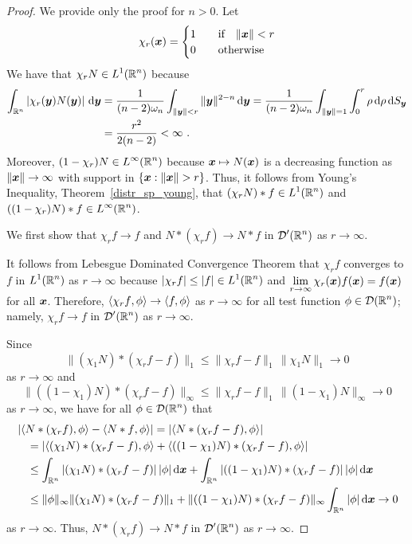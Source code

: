 \begin{proof}
We provide only the proof for $n>0$.  Let
\[
\chi_r({\bm{x}}) = \begin{cases}
1 & \quad \text{if} \quad \|{\bm{x}}\| < r \\
0 & \quad \text{otherwise}
\end{cases}
\]
We have that $\displaystyle \chi_r N \in L^1(\mathbb{R}^n)$ because
\begin{align*}
\int_{\mathbb{R}^n} \left| \chi_r({\bm{y}}) N({\bm{y}}) \right| \,\mathrm{d}{{\bm{y}}}
&= \frac{1}{(n-2)\omega_n} \int_{\|{\bm{y}}\|<r} \|{\bm{y}}\|^{2-n} \,\mathrm{d}{{\bm{y}}}
= \frac{1}{(n-2)\omega_n}
\int_{\|{\bm{y}}\|=1} \int_0^r \rho \,\mathrm{d}{\rho} \,\mathrm{d}{S_{{\bm{y}}}} \\
&= \frac{r^2}{2(n-2)} < \infty \ .
\end{align*}
Moreover, $\displaystyle (1-\chi_r)N \in L^{\infty}(\mathbb{R}^n)$ because
${\bm{x}} \mapsto N({\bm{x}})$ is a decreasing function as
$\|{\bm{x}}\|\to \infty$ with support in $\{{\bm{x}} : \|{\bm{x}} \| > r\}$.
Thus, it follows from Young's Inequality, Theorem~\ref{distr_sp_young},
that $\displaystyle ( \chi_r N ) \ast f \in L^1(\mathbb{R}^n)$ and
$\displaystyle ( (1-\chi_r)N ) \ast f \in L^{\infty}(\mathbb{R}^n)$.

We first show that $\chi_r f \to f$ and $N \ast (\chi_r f) \to N \ast f$ in
$\displaystyle \mathcal{D}'(\mathbb{R}^n)$ as $r \to \infty$.

It follows from Lebesgue Dominated Convergence Theorem that
$\chi_r f$ converges to $f$ in $\displaystyle L^1(\mathbb{R}^n)$ as $r \to \infty$
because $\displaystyle |\chi_r f| \leq |f| \in L^1(\mathbb{R}^n)$ and
$\displaystyle \lim_{r\to \infty}\chi_r({\bm{x}})f({\bm{x}}) = f({\bm{x}})$
for all ${\bm{x}}$.
Therefore, $\left\langle{\chi_r f} , {\phi}\right\rangle \to \left\langle{f} , {\phi}\right\rangle$ as $r\to \infty$
for all test function $\displaystyle \phi \in \mathcal{D}(\mathbb{R}^n)$; namely,
$\chi_r f \to f$ in $\displaystyle \mathcal{D}'(\mathbb{R}^n)$ as $r\to \infty$. 

Since
\[
\| (\chi_1 N) \ast (\chi_r f - f) \|_1 \leq \|\chi_r f - f\|_1
\, \|\chi_1 N\|_1 \to 0
\]
as $r \to \infty$ and
\[
\| ((1-\chi_1) N) \ast (\chi_r f - f) \|_{\infty} \leq \|\chi_r f - f\|_1
\, \|(1-\chi_1) N\|_\infty \to 0
\]
as $r \to \infty$, we have for all $\displaystyle \phi \in \mathcal{D}(\mathbb{R}^n)$ that
\begin{align*}
&\left| \left\langle{N\ast (\chi_r f)} , {\phi}\right\rangle - \left\langle{N\ast f} , {\phi}\right\rangle\right|
= \left| \left\langle{N\ast (\chi_r f -f)} , {\phi}\right\rangle\right| \\
&\quad = \left| \left\langle{(\chi_1 N) \ast (\chi_r f -f)} , {\phi}\right\rangle
+\left\langle{((1-\chi_1) N) \ast (\chi_r f -f)} , {\phi}\right\rangle\right| \\
&\quad \leq \int_{\mathbb{R}^n} |(\chi_1 N) \ast (\chi_r f -f) |\,
  |\phi|\,\mathrm{d}{{\bm{x}}}
+ \int_{\mathbb{R}^n} |((1-\chi_1)N) \ast (\chi_r f -f) |\, |\phi| \,\mathrm{d}{{\bm{x}}} \\
&\quad \leq \|\phi\|_{\infty} \|(\chi_1 N)\ast (\chi_r f -f) \|_1
+ \|((1-\chi_1)N) \ast (\chi_r f -f)\|_{\infty}\int_{\mathbb{R}^n} |\phi| \,\mathrm{d}{{\bm{x}}}
\to 0
\end{align*}
as $r \to \infty$.  Thus, $N \ast (\chi_r f) \to N \ast f$
in $\displaystyle \mathcal{D}'(\mathbb{R}^n)$ as $r \to \infty$.


\end{proof}
